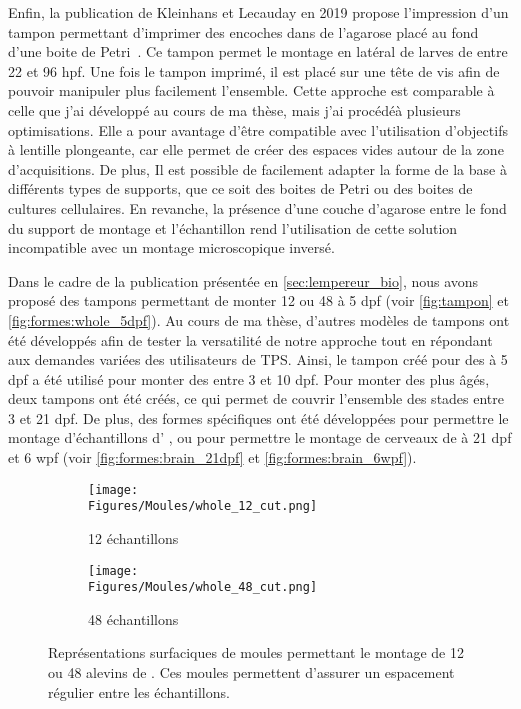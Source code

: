 \documentclass[\main/main.tex]{subfiles}
\begin{document}
Enfin, la publication de Kleinhans et Lecauday en 2019 propose l'impression d'un tampon permettant d'imprimer des encoches dans de l'agarose placé au fond d'une boite de Petri~\cite{kleinhans_2019}.
%
Ce tampon permet le montage en latéral de larves de \pz entre 22 et 96 hpf.
%
Une fois le tampon imprimé, il est placé sur une tête de vis afin de pouvoir manipuler plus facilement l'ensemble.
%
Cette approche est comparable à celle que j'ai développé au cours de ma thèse, mais j'ai procédéà plusieurs optimisations.
%
Elle a pour avantage d'être compatible avec l'utilisation d'objectifs à lentille plongeante, car elle permet de créer des espaces vides autour de la zone d'acquisitions.
%
De plus, Il est possible de facilement adapter la forme de la base à différents types de supports, que ce soit des boites de Petri ou des boites de cultures cellulaires.
%
En revanche, la présence d'une couche d'agarose entre le fond du support de montage et l'échantillon rend l'utilisation de cette solution incompatible avec un montage microscopique inversé.

% 
Dans le cadre de la publication présentée en \autoref{sec:lempereur_bio},
nous avons proposé des tampons permettant de monter 12 ou 48 \pzs{} à 5 dpf 
(voir \autoref{fig:tampon} et \autoref{fig:formes:whole_5dpf}).
%
Au cours de ma thèse, d'autres modèles de tampons ont été développés afin de tester la versatilité de notre approche tout en répondant aux demandes variées des utilisateurs de TPS.
%
Ainsi, le tampon créé pour des \pzs{} à 5 dpf a été utilisé pour monter des \pzs{} entre 3 et 10 dpf.
%
Pour monter des \pzs{} plus âgés, deux tampons ont été créés, ce qui permet de
couvrir l'ensemble des stades entre 3 et 21 dpf.
%
De plus, des formes spécifiques ont été développées pour permettre le montage d'échantillons
d' \ol{}, ou pour permettre le montage de cerveaux de \pz{} à 21 dpf et 6 wpf
(voir \autoref{fig:formes:brain_21dpf} et \autoref{fig:formes:brain_6wpf}).

\begin{figure}[h!]
    \centering
    \begin{subfigure}[b]{0.57\textwidth}
       \caption{
            \label{fig:tampon:12}
            12 échantillons
            }
       \centering \texttt{[image: \\Figures/Moules/whole\_12\_cut.png]}
    \end{subfigure}
    \begin{subfigure}[b]{0.38\textwidth}
       \caption{
        \label{fig:tampon:48}
        48 échantillons
        }
       \centering \texttt{[image: \\Figures/Moules/whole\_48\_cut.png]}
    \end{subfigure}
    \caption{
        \label{fig:tampon}
        Représentations surfaciques de moules permettant le montage de 12 ou 48 alevins de \pzs{}.
        Ces moules permettent d'assurer un espacement régulier entre les échantillons.
    }
    
\end{figure}
\end{document}
